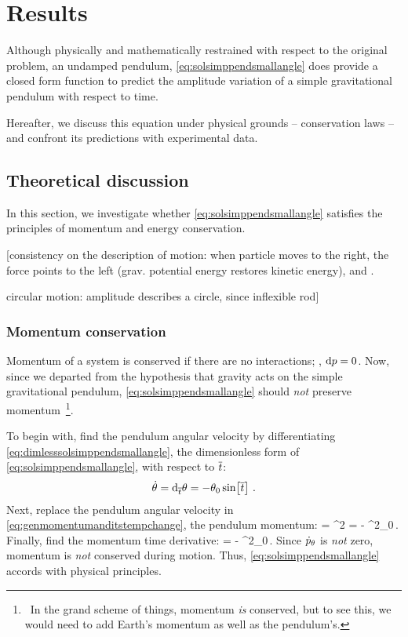 \section{Results}
Although physically and mathematically restrained with respect to the original problem, an undamped pendulum,  \cref{eq:solsimppendsmallangle} does provide a closed form function to predict the amplitude variation of a simple gravitational pendulum with respect to time. 

Hereafter, we discuss this equation under physical grounds -- conservation laws -- and confront its predictions with experimental data.


\subsection{Theoretical discussion}
In this section, we investigate whether \cref{eq:solsimppendsmallangle} satisfies the principles of momentum and energy conservation.

[consistency on the description of motion: when particle moves to the right, the force points to the left (grav. potential energy restores kinetic energy), and \vis.

circular motion: amplitude describes a circle, since inflexible rod]


\subsubsection{Momentum conservation}
Momentum of a system is conserved if there are no interactions; \ie, $\text{d}p = 0$. Now, since we departed from the hypothesis that gravity acts on the simple gravitational pendulum, \cref{eq:solsimppendsmallangle} should \emph{not} preserve momentum~\footnote{~In the grand scheme of things, momentum \emph{is} conserved, but to see this, we would need to add Earth's momentum as well as the pendulum's.}.

To begin with, find the pendulum angular velocity by differentiating \cref{eq:dimlesssolsimppendsmallangle}, the dimensionless form of \cref{eq:solsimppendsmallangle}, with respect to $\overline{t}$:
\begin{equation}\label{eq:angposandangvel}
\dot{\theta} = \text{d}_{\overline{t}}\theta = -\theta_0\sin\!\left[{\overline{t}}\right]\,.
\end{equation}
Next, replace the pendulum angular velocity in \cref{eq:genmomentumanditstempchange}, the pendulum momentum:
\beq
\igmom\angpos = \mass\length^2\angvel 
              = - \mass\length^2\angpos_0\sin{}\,.
\eeq
Finally, find the momentum time derivative:
\beq
\dtigmom\angpos = - \mass\length^2\angpos_0\cos{}\,.
\eeq
Since ${\dot{p}}_{\theta}$ is \emph{not} zero, momentum is \emph{not} conserved during motion. Thus, \cref{eq:solsimppendsmallangle} accords with physical principles.


